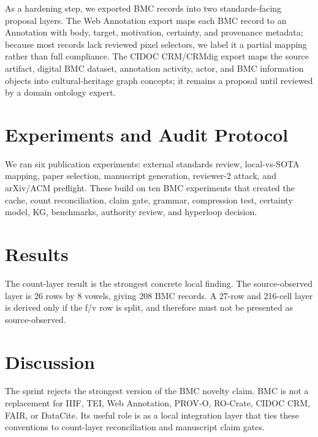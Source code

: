 \documentclass[manuscript]{acmart}
\begin{document}
As a hardening step, we exported BMC records into two standards-facing proposal layers. The Web Annotation export maps each BMC record to an Annotation with body, target, motivation, certainty, and provenance metadata; because most records lack reviewed pixel selectors, we label it a partial mapping rather than full compliance. The CIDOC CRM/CRMdig export maps the source artifact, digital BMC dataset, annotation activity, actor, and BMC information objects into cultural-heritage graph concepts; it remains a proposal until reviewed by a domain ontology expert.



\section{Experiments and Audit Protocol}
We ran six publication experiments: external standards review, local-vs-SOTA mapping, paper selection, manuscript generation, reviewer-2 attack, and arXiv/ACM preflight. These build on ten BMC experiments that created the cache, count reconciliation, claim gate, grammar, compression test, certainty model, KG, benchmarks, authority review, and hyperloop decision.



\section{Results}
The count-layer result is the strongest concrete local finding. The source-observed layer is 26 rows by 8 vowels, giving 208 BMC records. A 27-row and 216-cell layer is derived only if the f/v row is split, and therefore must not be presented as source-observed.





\section{Discussion}
The sprint rejects the strongest version of the BMC novelty claim. BMC is not a replacement for IIIF, TEI, Web Annotation, PROV-O, RO-Crate, CIDOC CRM, FAIR, or DataCite. Its useful role is as a local integration layer that ties these conventions to count-layer reconciliation and manuscript claim gates.


\end{document}
